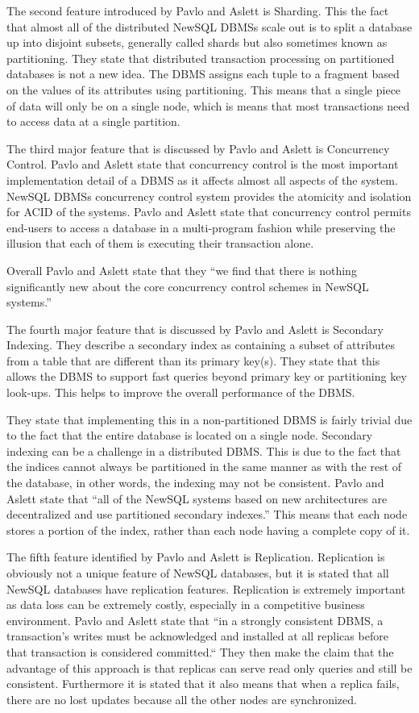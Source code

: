 \documentclass[10pt, conference]{IEEEtran}
\begin{document}
The second feature introduced by Pavlo and Aslett is Sharding. This the fact that almost all of the distributed NewSQL DBMSs scale out is to split a database up into disjoint subsets, generally called shards but also sometimes known as partitioning. They state that distributed transaction processing on partitioned databases is not a new idea. The DBMS assigns each tuple to a fragment based on the values of its attributes using partitioning. This means that a single piece of data will only be on a single node, which is means that most transactions need to access data at a single partition.

The third major feature that is discussed by Pavlo and Aslett is Concurrency Control. Pavlo and Aslett state that concurrency control is the most important implementation detail of a DBMS as it affects almost all aspects of the system. NewSQL DBMSs concurrency control system provides the atomicity and isolation for ACID of the systems. Pavlo and Aslett state that concurrency control permits end-users to access a database in a multi-program fashion while preserving the illusion that each of them is executing their transaction alone. 

Overall Pavlo and Aslett state that they ``we find that there is nothing significantly new about the core concurrency control schemes in NewSQL systems.''

The fourth major feature that is discussed by Pavlo and Aslett is Secondary Indexing. They describe a secondary index as containing a subset of attributes from a table that are different than its primary key(s). They state that this allows the DBMS to support fast queries beyond primary key or partitioning key look-ups. This helps to improve the overall performance of the DBMS.

They state that implementing this in a non-partitioned DBMS is fairly trivial due to the fact that the entire database is located on a single node. Secondary indexing can be a challenge in a distributed DBMS. This is due to the fact that the indices cannot always be partitioned in the same manner as with the rest of the database, in other words, the indexing may not be consistent. Pavlo and Aslett state that ``all of the NewSQL systems based on new architectures are decentralized and use partitioned secondary indexes.'' This means that each node stores a portion of the index, rather than each node having a complete copy of it. 

The fifth feature identified by Pavlo and Aslett is Replication. Replication is obviously not a unique feature of NewSQL databases, but it is stated that all NewSQL databases have replication features. Replication is extremely important as data loss can be extremely costly, especially in a competitive business environment. Pavlo and Aslett state that ``in a strongly consistent DBMS, a transaction's writes must be acknowledged and installed at all replicas before that transaction is considered committed.`` They then make the claim that the advantage of this approach is that replicas can serve read only queries and still be consistent. Furthermore it is stated that it also means that when a replica fails, there are no lost updates because all the other nodes are synchronized. 
\end{document}
